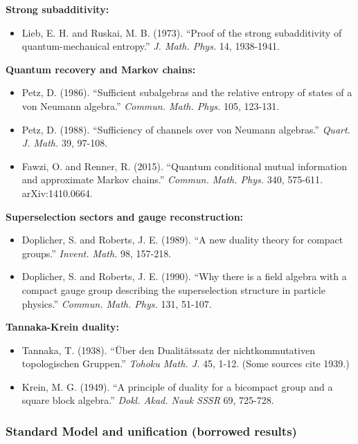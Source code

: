 \documentclass[11pt,a4paper]{article}
\theoremstyle{remark}
\providecommand{\tightlist}{%
  \setlength{\itemsep}{0pt}\setlength{\parskip}{0pt}}
\begin{document}
\textbf{Strong subadditivity:}

\begin{itemize}
\tightlist
\item
  Lieb, E. H. and Ruskai, M. B. (1973). ``Proof of the strong subadditivity of
  quantum-mechanical entropy.'' \emph{J. Math. Phys.} 14, 1938-1941.
\end{itemize}

\textbf{Quantum recovery and Markov chains:}

\begin{itemize}
\tightlist
\item
  Petz, D. (1986). ``Sufficient subalgebras and the relative entropy of states
  of a von Neumann algebra.'' \emph{Commun. Math. Phys.} 105, 123-131.
\item
  Petz, D. (1988). ``Sufficiency of channels over von Neumann algebras.''
  \emph{Quart. J. Math.} 39, 97-108.
\item
  Fawzi, O. and Renner, R. (2015). ``Quantum conditional mutual information
  and approximate Markov chains.'' \emph{Commun. Math. Phys.} 340, 575-611.
  arXiv:1410.0664.
\end{itemize}

\textbf{Superselection sectors and gauge reconstruction:}

\begin{itemize}
\tightlist
\item
  Doplicher, S. and Roberts, J. E. (1989). ``A new duality theory for compact
  groups.'' \emph{Invent. Math.} 98, 157-218.
\item
  Doplicher, S. and Roberts, J. E. (1990). ``Why there is a field algebra with
  a compact gauge group describing the superselection structure in particle
  physics.'' \emph{Commun. Math. Phys.} 131, 51-107.
\end{itemize}

\textbf{Tannaka-Krein duality:}

\begin{itemize}
\tightlist
\item
  Tannaka, T. (1938). ``Über den Dualit\"atssatz der nichtkommutativen
  topologischen Gruppen.'' \emph{Tohoku Math. J.} 45, 1-12. (Some sources cite 1939.)
\item
  Krein, M. G. (1949). ``A principle of duality for a bicompact group and a
  square block algebra.'' \emph{Dokl. Akad. Nauk SSSR} 69, 725-728.
\end{itemize}

\subsubsection{Standard Model and unification (borrowed results)}\label{standard-model-and-unification-borrowed-results}
\end{document}
